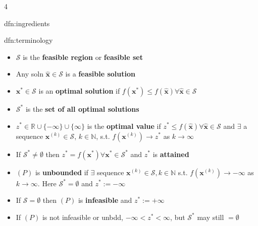 \documentclass[landscape, 8pt]{extarticle}
\begin{document}
\begin{multicols*}{4}
\begin{dfn}[Ingredients]{dfn:ingredients}{ }
		\end{dfn}
		
		
		\begin{dfn}[Terminology]{dfn:terminology}{ }
			\begin{itemize}
				\item $\mathcal{S}$ is the \textbf{feasible region} or \textbf{feasible set}
				\item Any soln $\mathbf{\hat{x}}\in \mathcal{S}$ is a \textbf{feasible solution}
				\item $\mathbf{x}^*\in \mathcal{S}$ is an \textbf{optimal solution} if $f(\mathbf{x}^*) \le f(\mathbf{\hat{x}}) \forall \mathbf{\hat{x}}\in \mathcal{S}$
				\item $\mathcal{S}^*$ is the \textbf{set of all optimal solutions}
				\item $z^*\in \mathbb{R} \cup \{-\infty\} \cup \{\infty\}$ is the \textbf{optimal value} if $z^* \le f(\mathbf{\hat{x}}) \forall \mathbf{\hat{x}}\in \mathcal{S}$ and $\exists$ a sequence $\mathbf{x}^{(k)}\in \mathcal{S}$, $k\in \mathbb{N}$, s.t. $f(\mathbf{x}^{(k)}) \to z^*$ as $k \to \infty$
				\item If $\mathcal{S}^* \ne \emptyset$ then $z^* = f(\mathbf{x}^*) \forall \mathbf{x}^*\in \mathcal{S}^*$ and $z^*$ is \textbf{attained}
				\item $(P)$ is \textbf{unbounded} if $\exists$ sequence $\mathbf{x}^{(k)}\in \mathcal{S}, k\in \mathbb{N}$ s.t. $f(\mathbf{x}^{(k)}) \to -\infty$ as $k \to \infty$. Here $\mathcal{S}^* = \emptyset$ and $z^* := -\infty$
				\item If $\mathcal{S} = \emptyset$ then $(P)$ is \textbf{infeasible} and $z^* := +\infty$
				\item If $(P)$ is not infeasible or unbdd, $-\infty < z^* < \infty$, but $\mathcal{S}^*$ may still $= \emptyset$
			\end{itemize}
			
			
		\end{dfn}
		

\end{multicols*}
\end{document}
